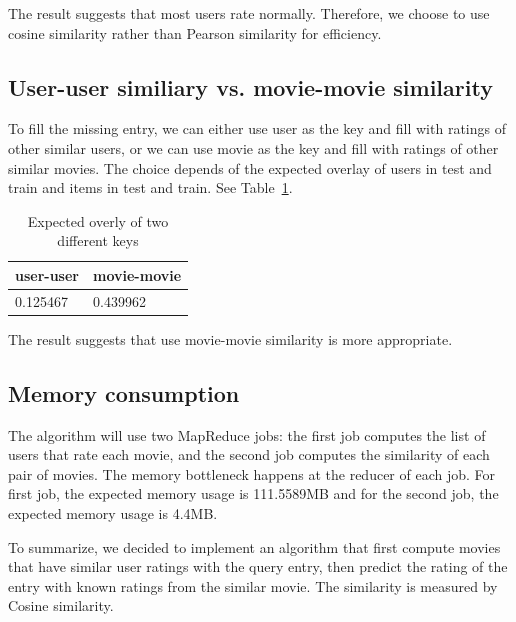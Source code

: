 The result suggests that most users rate normally. Therefore, we
choose to use cosine similarity rather than Pearson similarity for
efficiency.

\subsection*{User-user similiary vs. movie-movie similarity}
To fill the missing entry, we can either use user as the key and fill with
ratings of other similar users, or we can use movie as the key and
fill with ratings of other similar movies. The choice depends of the
expected overlay of users in test and train and items in test and
train. See Table~\ref{tab:overlay}.

\begin{table}[!ht]
  \centering
  \begin{tabular}{|p{5cm}|p{5cm}|}
    \hline
    user-user & movie-movie\\
    \hline
    0.125467 & 0.439962\\
    \hline
  \end{tabular}
  \caption{Expected overly of two different keys}
  \label{tab:overlay}
\end{table}

The result suggests that use movie-movie similarity is more
appropriate.

\subsection*{Memory consumption}
The algorithm will use two MapReduce jobs: the first job computes
the list of users that rate each movie, and the second job computes
the similarity of each pair of movies. The memory bottleneck happens
at the reducer of each job. For first job, the expected memory usage
is 111.5589MB and for the second job, the expected memory usage is 4.4MB.

To summarize, we decided to implement an algorithm that first compute
movies that have similar user ratings with the query entry, then
predict the rating of the entry with known ratings from the similar
movie. The similarity is measured by Cosine similarity.
